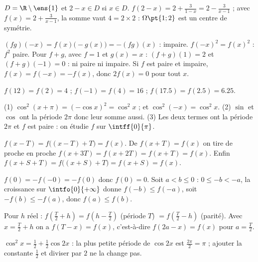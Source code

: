 \begin{solution}
$D=\R\setminus\ens{1}$ et $2-x\in D$ si $x\in D$. $f(2-x)=2+\frac{3}{1-x}=2-\frac{3}{x-1}$ ; avec $f(x)=2+\frac{3}{x-1}$, la somme vaut $4=2\times2$ : $\Omega\pt{1;2}$ est un centre de symétrie.
\end{solution}
\begin{solution}
$(fg)(-x)=f(x)\bigl(-g(x)\bigr)=-(fg)(x)$ : impaire. $f(-x)^2=f(x)^2$ : $f^2$ paire. Pour $f+g$, avec $f=1$ et $g(x)=x$ : $(f+g)(1)=2$ et $(f+g)(-1)=0$ : ni paire ni impaire. Si $f$ est paire et impaire, $f(x)=f(-x)=-f(x)$, donc $2f(x)=0$ pour tout $x$.
\end{solution}
\begin{solution}
$f(12)=f(2)=4$ ; $f(-1)=f(4)=16$ ; $f(\num{17,5})=f(\num{2,5})=\num{6,25}$.
\end{solution}
\begin{solution}
(1) $\cos^2(x+\pi)=(-\cos x)^2=\cos^2x$ ; et $\cos^2(-x)=\cos^2x$. (2) $\sin$ et $\cos$ ont la période $2\pi$ donc leur somme aussi. (3) Les deux termes ont la période $2\pi$ et $f$ est paire : on étudie $f$ sur $\intff{0}{\pi}$.
\end{solution}
\begin{solution}
$f(x-T)=f\bigl((x-T)+T\bigr)=f(x)$. De $f(x+T)=f(x)$ on tire de proche en proche $f(x+3T)=f(x+2T)=f(x+T)=f(x)$. Enfin $f(x+S+T)=f\bigl((x+S)+T\bigr)=f(x+S)=f(x)$.
\end{solution}
\begin{solution}
$f(0)=-f(-0)=-f(0)$ donc $f(0)=0$. Soit $a<b\le0$ : $0\le-b<-a$, la croissance sur $\intfo{0}{+\infty}$ donne $f(-b)\le f(-a)$, soit $-f(b)\le-f(a)$, donc $f(a)\le f(b)$.
\end{solution}
\begin{solution}
Pour $h$ réel : $f(\frac T2+h)=f(h-\frac T2)$ (période $T$) $=f(\frac T2-h)$ (parité). Avec $x=\frac T2+h$ on a $f(T-x)=f(x)$, c'est-à-dire $f(2a-x)=f(x)$ pour $a=\frac T2$.
\end{solution}
\begin{solution}
$\cos^2x=\frac12+\frac12\cos 2x$ : la plus petite période de $\cos 2x$ est $\frac{2\pi}{2}=\pi$ ; ajouter la constante $\frac12$ et diviser par $2$ ne la change pas.
\end{solution}
